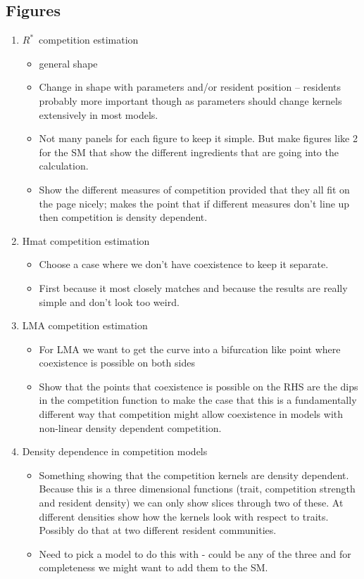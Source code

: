\documentclass[a4paper,11pt]{article}
\newcommand{\Rstar}{\ensuremath{R^*}}
\begin{document}
\subsection{Figures}

\begin{enumerate}
\item \Rstar\ competition estimation
  \begin{itemize}
  \item general shape
  \item Change in shape with parameters and/or resident position --
    residents probably more important though as parameters should
    change kernels extensively in most models.
  \item Not many panels for each figure to keep it simple.  But make
    figures like 2 for the SM that show the different ingredients that
    are going into the calculation.
  \item Show the different measures of competition provided that they
    all fit on the page nicely; \citet{Abrams-2008} makes the point
    that if different measures don't line up then competition is
    density dependent.
  \end{itemize}
\item Hmat competition estimation
  \begin{itemize}
  \item Choose a case where we don't have coexistence to keep it
    separate.
  \item First because it most closely matches \citet{Kisdi-1999} and
    because the results are really simple and don't look too weird.
  \end{itemize}
\item LMA competition estimation
  \begin{itemize}
  \item For LMA we want to get the curve into a bifurcation like point
    where coexistence is possible on both sides
  \item Show that the points that coexistence is possible on the RHS
    are the dips in the competition function to make the case that
    this is a fundamentally different way that competition might allow
    coexistence in models with non-linear density dependent
    competition.
  \end{itemize}
\item Density dependence in competition models
  \begin{itemize}
  \item Something showing that the competition kernels are density
    dependent.  Because this is a three dimensional functions (trait,
    competition strength and resident density) we can only show slices
    through two of these.  At different densities show how the
    kernels look with respect to traits.  Possibly do that at two
    different resident communities.
  \item Need to pick a model to do this with - could be any of the
    three and for completeness we might want to add them to the SM.
  \end{itemize}
\end{enumerate}
\end{document}
